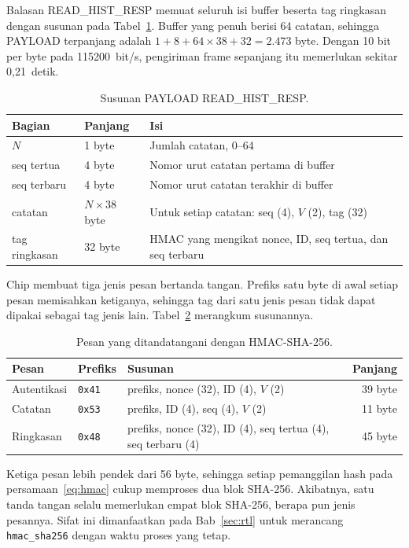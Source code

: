 \documentclass[11pt,a4paper]{article}
\begin{document}
Balasan READ\_HIST\_RESP memuat seluruh isi buffer beserta tag ringkasan dengan susunan pada
Tabel~\ref{tab:riwayat}. Buffer yang penuh berisi 64 catatan, sehingga PAYLOAD terpanjang adalah
$1 + 8 + 64 \times 38 + 32 = 2.473$ byte. Dengan 10 bit per byte pada 115200~bit/s, pengiriman
frame sepanjang itu memerlukan sekitar 0,21~detik.

\begin{table}[H]
  \centering
  \small
  \begin{tabularx}{\textwidth}{l l X}
    \toprule
    Bagian & Panjang & Isi \\
    \midrule
    $N$ & 1 byte & Jumlah catatan, 0--64 \\
    seq tertua & 4 byte & Nomor urut catatan pertama di buffer \\
    seq terbaru & 4 byte & Nomor urut catatan terakhir di buffer \\
    catatan & $N \times 38$ byte & Untuk setiap catatan: seq (4), $V$ (2), tag (32) \\
    tag ringkasan & 32 byte & HMAC yang mengikat nonce, ID, seq tertua, dan seq terbaru \\
    \bottomrule
  \end{tabularx}
  \caption{Susunan PAYLOAD READ\_HIST\_RESP.}
  \label{tab:riwayat}
\end{table}

Chip membuat tiga jenis pesan bertanda tangan. Prefiks satu byte di awal setiap pesan memisahkan
ketiganya, sehingga tag dari satu jenis pesan tidak dapat dipakai sebagai tag jenis lain.
Tabel~\ref{tab:pesan} merangkum susunannya.

\begin{table}[H]
  \centering
  \small
  \begin{tabularx}{\textwidth}{l l X r}
    \toprule
    Pesan & Prefiks & Susunan & Panjang \\
    \midrule
    Autentikasi & \texttt{0x41} & prefiks, nonce (32), ID (4), $V$ (2) & 39 byte \\
    Catatan & \texttt{0x53} & prefiks, ID (4), seq (4), $V$ (2) & 11 byte \\
    Ringkasan & \texttt{0x48} & prefiks, nonce (32), ID (4), seq tertua (4), seq terbaru (4)
      & 45 byte \\
    \bottomrule
  \end{tabularx}
  \caption{Pesan yang ditandatangani dengan HMAC-SHA-256.}
  \label{tab:pesan}
\end{table}

Ketiga pesan lebih pendek dari 56 byte, sehingga setiap pemanggilan hash pada
persamaan~\eqref{eq:hmac} cukup memproses dua blok SHA-256. Akibatnya, satu tanda tangan selalu
memerlukan empat blok SHA-256, berapa pun jenis pesannya. Sifat ini dimanfaatkan pada
Bab~\ref{sec:rtl} untuk merancang \texttt{hmac\_sha256} dengan waktu proses yang tetap.
\end{document}
